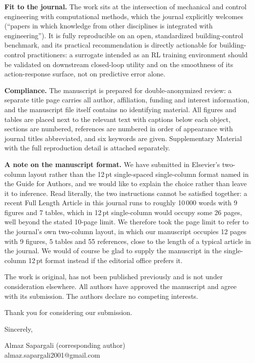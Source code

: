 \documentclass[11pt,a4paper]{article}
\begin{document}
\textbf{Fit to the journal.} The work sits at the intersection of mechanical and control engineering
with computational methods, which the journal explicitly welcomes (``papers in which knowledge from
other disciplines is integrated with engineering''). It is fully reproducible on an open,
standardized building-control benchmark, and its practical recommendation is directly actionable for
building-control practitioners: a surrogate intended as an RL training environment should be
validated on downstream closed-loop utility and on the smoothness of its action-response surface,
not on predictive error alone.

\textbf{Compliance.} The manuscript is prepared for double-anonymized review: a separate title page
carries all author, affiliation, funding and interest information, and the manuscript file itself
contains no identifying material. All figures and tables are placed next to the relevant text with
captions below each object, sections are numbered, references are numbered in order of appearance
with journal titles abbreviated, and six keywords are given. Supplementary Material with the full
reproduction detail is attached separately.

\textbf{A note on the manuscript format.} We have submitted in Elsevier's two-column layout rather
than the 12\,pt single-spaced single-column format named in the Guide for Authors, and we would like
to explain the choice rather than leave it to inference. Read literally, the two instructions cannot
be satisfied together: a recent Full Length Article in this journal runs to roughly 10\,000 words
with 9 figures and 7 tables, which in 12\,pt single-column would occupy some 26 pages, well beyond
the stated 10-page limit. We therefore took the page limit to refer to the journal's own two-column
layout, in which our manuscript occupies 12 pages with 9 figures, 5 tables and 55 references, close
to the length of a typical article in the journal. We would of course be glad to supply the
manuscript in the single-column 12\,pt format instead if the editorial office prefers it.

The work is original, has not been published previously and is not under consideration elsewhere.
All authors have approved the manuscript and agree with its submission. The authors declare no
competing interests.

Thank you for considering our submission.

Sincerely,

Almaz Sapargali (corresponding author)\\
almaz.sapargali2001@gmail.com
\end{document}
